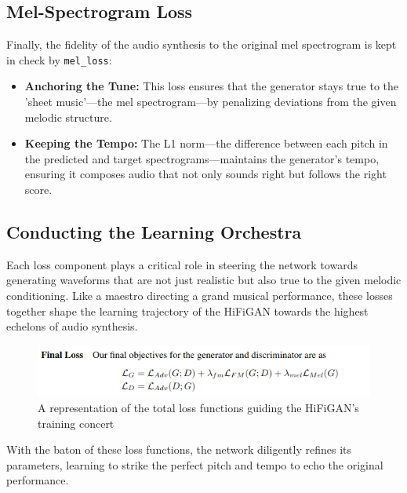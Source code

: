 \documentclass[a4paper]{article}
\begin{document}
\subsection{Mel-Spectrogram Loss}

Finally, the fidelity of the audio synthesis to the original mel spectrogram is kept in check by \verb|mel_loss|:

\begin{itemize}
  \item \textbf{Anchoring the Tune:} This loss ensures that the generator stays true to the 'sheet music'—the mel spectrogram—by penalizing deviations from the given melodic structure.
  
  \item \textbf{Keeping the Tempo:} The L1 norm—the difference between each pitch in the predicted and target spectrograms—maintains the generator's tempo, ensuring it composes audio that not only sounds right but follows the right score.
\end{itemize}

\subsection{Conducting the Learning Orchestra}

Each loss component plays a critical role in steering the network towards generating waveforms that are not just realistic but also true to the given melodic conditioning. Like a maestro directing a grand musical performance, these losses together shape the learning trajectory of the HiFiGAN towards the highest echelons of audio synthesis.

\begin{figure}[ht]
  \centering
  \includegraphics[width=\linewidth]{hifigan-loss-functions.png}
  \caption{A representation of the total loss functions guiding the HiFiGAN's training concert}
  \label{fig:hifigan-loss-functions}
\end{figure}

With the baton of these loss functions, the network diligently refines its parameters, learning to strike the perfect pitch and tempo to echo the original performance.

\end{document}
